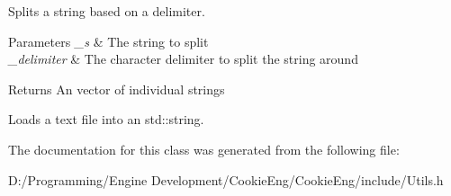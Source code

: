 Splits a string based on a delimiter. 


\begin{DoxyParams}{Parameters}
{\em \+\_\+s} & The string to split \\
\hline
{\em \+\_\+delimiter} & The character delimiter to split the string around \\
\hline
\end{DoxyParams}
\begin{DoxyReturn}{Returns}
An vector of individual strings
\end{DoxyReturn}
Loads a text file into an std\+::string. 

The documentation for this class was generated from the following file\+:\begin{DoxyCompactItemize}
\item 
D\+:/\+Programming/\+Engine Development/\+Cookie\+Eng/\+Cookie\+Eng/include/Utils.\+h\end{DoxyCompactItemize}
